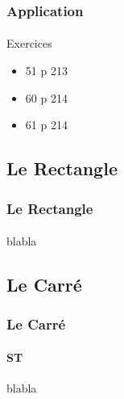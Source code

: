 \documentclass{beamer}
\begin{document}
\begin{frame}
	\frametitle{Application}  
	\framesubtitle{}
	
	\begin{block}{Exercices}
		\begin{itemize}
			\item 51 p 213
			\item 60 p 214
			\item 61 p 214
		\end{itemize}
	\end{block}
\end{frame}

\subsection{Le Rectangle}

\begin{frame}
\frametitle{Le Rectangle}  
\framesubtitle{}
blabla
\end{frame}

\subsection{Le Carré}

\begin{frame}
\frametitle{Le Carré}  
\framesubtitle{ST}
blabla
\end{frame}
\end{document}
